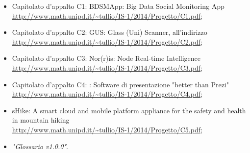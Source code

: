 \begin{itemize}
    \item Capitolato d’appalto C1: BDSMApp: Big Data Social Monitoring App \\ \url{http://www.math.unipd.it/~tullio/IS-1/2014/Progetto/C1.pdf};
    \item Capitolato d’appalto C2: GUS: Glass (Uni) Scanner, all’indirizzo \\ \url{http://www.math.unipd.it/~tullio/IS-1/2014/Progetto/C2.pdf};
    \item Capitolato d’appalto C3: Nor(r)is: Node Real-time Intelligence \\ \url{http://www.math.unipd.it/~tullio/IS-1/2014/Progetto/C3.pdf};
    \item Capitolato d’appalto C4: \PROGETTO: Software di presentazione "better than Prezi" \\ \url{http://www.math.unipd.it/~tullio/IS-1/2014/Progetto/C4.pdf};
    \item sHike: A smart cloud and mobile platform appliance for the safety and health in mountain hiking \\ \url{http://www.math.unipd.it/~tullio/IS-1/2014/Progetto/C5.pdf};
    \item \textit{"Glossario v1.0.0"}.
 
 
 

\end{itemize}
